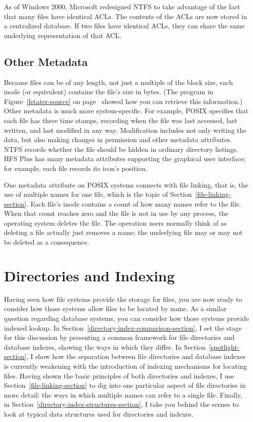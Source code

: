 As of Windows 2000, Microsoft redesigned NTFS to take advantage of the
fact that many files have identical ACLs.  The contents of the ACLs are
now stored in a centralized database.  If two files have identical
ACLs, they can share the same underlying representation of that ACL.

\subsection{Other Metadata}\label{other-metadata-section}

Because files can be of any length, not just a multiple of the block
size, each inode (or equivalent) contains the file's size in bytes.
(The program in Figure~\ref{fstater-source} on page~\pageref{fstater-source} showed how you can
retrieve this information.)  Other metadata is much more
system-specific.  For example, POSIX specifies that each file has
three time stamps, recording when the file was last accessed, last
written, and last modified in any way. Modification includes not only  writing the
data, but also making changes in
permission and other metadata attributes.  NTFS records whether
the file should be hidden in ordinary directory listings.  HFS Plus
has many metadata attributes supporting the graphical user interface;
for example, each file records its icon's position.

One metadata attribute on POSIX systems connects with file linking,
that is, the use of multiple names for one file, which is the
topic of Section~\ref{file-linking-section}.  Each file's inode contains a count of how many names
refer to the file.  When that count reaches zero and the file is not
in use by any process, the operating system deletes the file.  The
operation users normally think of as deleting a file actually just
removes a name; the underlying file may or may not be deleted as a
consequence.

\section{Directories and Indexing}
\label{directory-indexing-section}

Having seen how file systems provide the storage for files, you are now ready to
consider how those
systems allow files to be located by name.  As a similar question regarding
database systems, you can consider how those systems provide indexed lookup.  In
Section~\ref{directory-index-comparison-section}, I set the stage for
this discussion by presenting a common framework for file directories
and database indexes, showing the ways in which they differ.
In Section~\ref{spotlight-section}, I show how the separation
between file directories and database indexes is currently weakening
with the introduction of indexing mechanisms for locating files.
Having shown the basic principles of both directories and indexes, I use
Section~\ref{file-linking-section} to dig into one particular aspect of
file directories in more detail: the ways in which multiple names can
refer to a single file.  Finally, in
Section~\ref{directory-index-structures-section}, I take you behind
the scenes to look at typical data structures used for directories and indexes.

